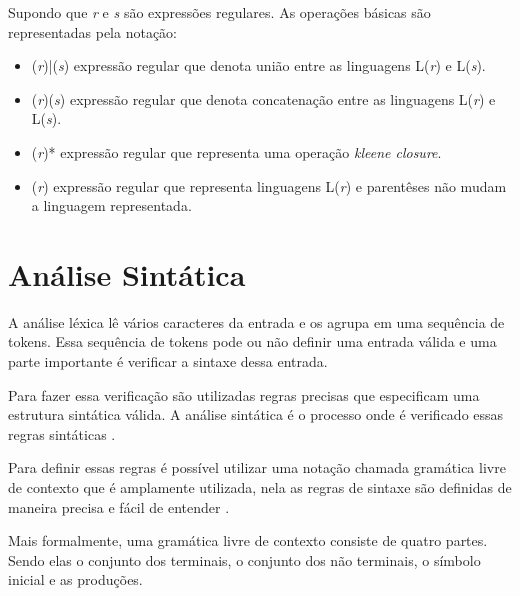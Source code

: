 Supondo que \textit{r} e \textit{s} são expressões regulares. As operações básicas 
são representadas pela notação:

\begin{itemize}
    \item (\textit{r})|(\textit{s}) expressão regular que denota união entre as linguagens L(\textit{r}) e 
    L(\textit{s}).
    \item (\textit{r})(\textit{s}) expressão regular que denota concatenação entre as linguagens L(\textit{r}) e 
    L(\textit{s}).
    \item (\textit{r})* expressão regular que representa uma operação \textit{kleene closure}.
    \item (\textit{r}) expressão regular que representa linguagens L(\textit{r}) e parentêses não mudam
    a linguagem representada.    
\end{itemize}


\section{Análise Sintática}

A análise léxica lê vários caracteres da entrada e os agrupa em uma sequência de tokens. Essa sequência de
tokens pode ou não definir uma entrada válida e uma parte importante é verificar a sintaxe dessa entrada.

Para fazer essa verificação são utilizadas regras precisas que especificam uma estrutura sintática válida.
A análise sintática é o processo onde é verificado essas regras sintáticas \cite{aho2006}. 

Para definir essas regras é possível utilizar uma notação chamada gramática livre de contexto que é amplamente
utilizada, nela as regras de sintaxe são definidas de maneira precisa e fácil de entender \cite{aho2006}.

Mais formalmente, uma gramática livre de contexto consiste de quatro partes. Sendo elas
o conjunto dos terminais, o conjunto dos não terminais, o símbolo inicial e as produções.

